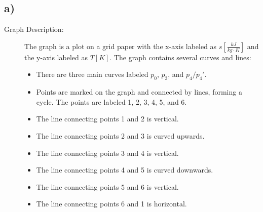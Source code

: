 

\subsection*{a)}

\begin{description}
    \item[Graph Description:] The graph is a plot on a grid paper with the x-axis labeled as \( s \left[ \frac{kJ}{kg \cdot K} \right] \) and the y-axis labeled as \( T [K] \). The graph contains several curves and lines:
    \begin{itemize}
        \item There are three main curves labeled \( p_0 \), \( p_3 \), and \( p_4/p_4' \).
        \item Points are marked on the graph and connected by lines, forming a cycle. The points are labeled 1, 2, 3, 4, 5, and 6.
        \item The line connecting points 1 and 2 is vertical.
        \item The line connecting points 2 and 3 is curved upwards.
        \item The line connecting points 3 and 4 is vertical.
        \item The line connecting points 4 and 5 is curved downwards.
        \item The line connecting points 5 and 6 is vertical.
        \item The line connecting points 6 and 1 is horizontal.
    \end{itemize}
\end{description}